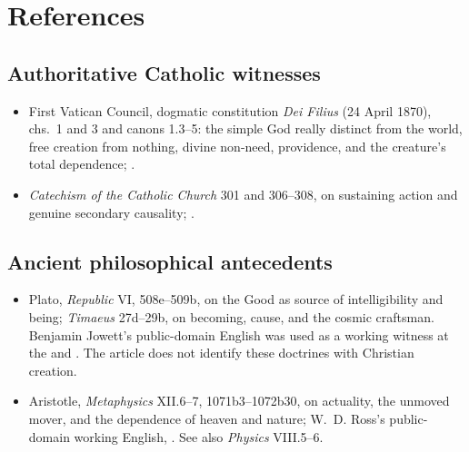 \section{References}

\begingroup
\sloppy

\subsection*{Authoritative Catholic witnesses}

{\fontsize{8.6}{9.6}\selectfont
\begin{itemize}[itemsep=0pt,parsep=0pt,topsep=0.05em]
\item First Vatican Council, dogmatic constitution \emph{Dei Filius} (24 April 1870), chs.~1 and 3 and canons 1.3--5: the simple God really distinct from the world, free creation from nothing, divine non-need, providence, and the creature's total dependence; .
\item \emph{Catechism of the Catholic Church} 301 and 306--308, on sustaining action and genuine secondary causality; .
\end{itemize}}

\subsection*{Ancient philosophical antecedents}

{\fontsize{8.6}{9.6}\selectfont
\begin{itemize}[itemsep=0pt,parsep=0pt,topsep=0.05em]
\item Plato, \emph{Republic} VI, 508e--509b, on the Good as source of intelligibility and being; \emph{Timaeus} 27d--29b, on becoming, cause, and the cosmic craftsman. Benjamin Jowett's public-domain English was used as a working witness at the  and . The article does not identify these doctrines with Christian creation.
\item Aristotle, \emph{Metaphysics} XII.6--7, 1071b3--1072b30, on actuality, the unmoved mover, and the dependence of heaven and nature; W.~D. Ross's public-domain working English, . See also \emph{Physics} VIII.5--6.
\end{itemize}}

